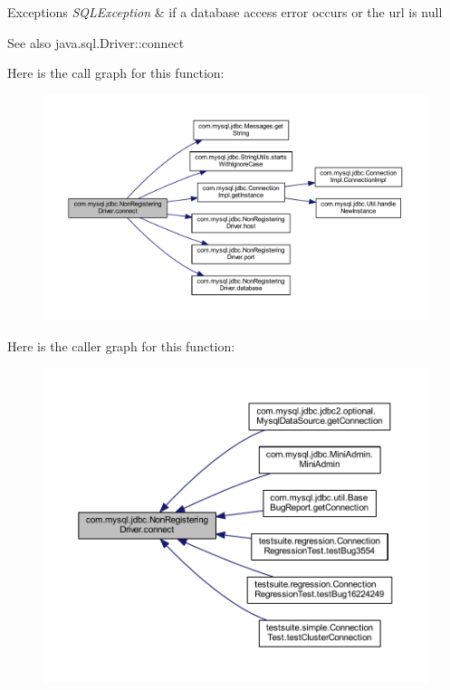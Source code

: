 \begin{DoxyExceptions}{Exceptions}
{\em S\+Q\+L\+Exception} & if a database access error occurs or the url is null\\
\hline
\end{DoxyExceptions}
\begin{DoxySeeAlso}{See also}
java.\+sql.\+Driver\+::connect 
\end{DoxySeeAlso}
Here is the call graph for this function\+:
\nopagebreak
\begin{figure}[H]
\begin{center}
\leavevmode
\includegraphics[width=350pt]{classcom_1_1mysql_1_1jdbc_1_1_non_registering_driver_a834c012e752a01d1ee435b3461bb8218_cgraph}
\end{center}
\end{figure}
Here is the caller graph for this function\+:
\nopagebreak
\begin{figure}[H]
\begin{center}
\leavevmode
\includegraphics[width=350pt]{classcom_1_1mysql_1_1jdbc_1_1_non_registering_driver_a834c012e752a01d1ee435b3461bb8218_icgraph}
\end{center}
\end{figure}
\mbox{\label{classcom_1_1mysql_1_1jdbc_1_1_non_registering_driver_a909c0d681654054551d09e9c842f5727}} 

